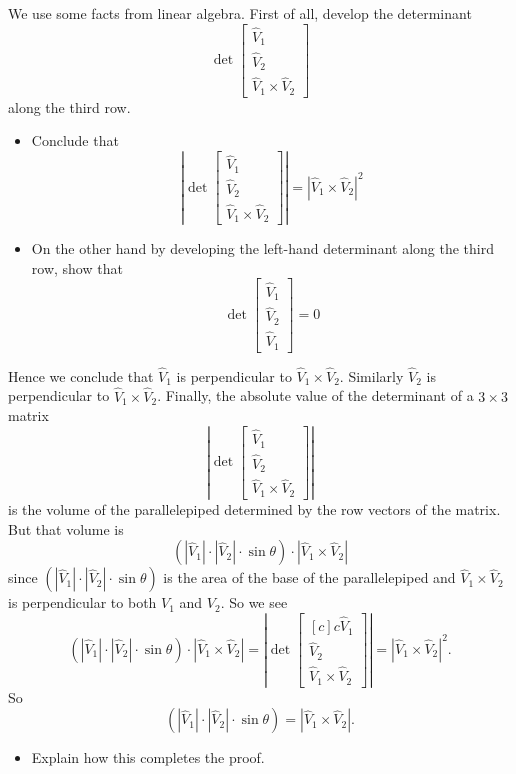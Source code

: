 \documentclass{ximera}
\begin{document}
\begin{problem}
We use some facts from linear algebra. First of all, develop the determinant%
\[
\det
\begin{bmatrix}
\hat{V}_{1} \\
\hat{V}_{2} \\
\hat{V}_{1}\times\hat{V}_{2}
\end{bmatrix}
\]
along the third row.
\begin{itemize}
\item Conclude that 
\[
\left\vert
\det
\begin{bmatrix}
\hat{V}_{1} \\
\hat{V}_{2} \\
\hat{V}_{1}\times\hat{V}_{2}
\end{bmatrix}\right\vert
=\left\vert \hat{V}_{1}\times\hat{V}_{2}\right\vert ^{2}
\]
\item On the other hand by developing the left-hand determinant along
  the third row, show that
\[
\det
\begin{bmatrix}
\hat{V}_{1} \\
\hat{V}_{2} \\
\hat{V}_{1}
\end{bmatrix}
=0
\]
\end{itemize}
Hence we conclude that $\hat{V}_{1}$ is perpendicular to
$\hat{V}_{1}\times\hat{V}_{2}$. Similarly $\hat{V}_{2}$ is
perpendicular to $\hat{V}_{1}\times\hat{V}_{2}$. Finally, the absolute
value of the determinant of a $3\times3$ matrix%
\[
\left\vert
\det
\begin{bmatrix}
\hat{V}_{1} \\
\hat{V}_{2} \\
\hat{V}_{1}\times\hat{V}_{2}
\end{bmatrix}
\right\vert
\]
is the volume of the parallelepiped determined by the row vectors of the
matrix. But that volume is%
\[
\left( \left\vert \hat{V}_{1}\right\vert \cdot\left\vert \hat{V}%
_{2}\right\vert \cdot\sin\theta\right)  \cdot\left\vert \hat{V}%
_{1}\times\hat{V}_{2}\right\vert
\]
since $\left(  \left\vert \hat{V}_{1}\right\vert \cdot\left\vert \hat{V}%
_{2}\right\vert \cdot\sin\theta\right)  $ is the area of the base
of the parallelepiped and $\hat{V}_{1}\times\hat{V}_{2}$ is perpendicular to
both $V_{1}$ and $V_{2}$. So we see
\[
\left(  \left\vert \hat{V}_{1}\right\vert \cdot\left\vert \hat{V}%
_{2}\right\vert \cdot\sin\theta\right)  \cdot\left\vert \hat{V}%
_{1}\times\hat{V}_{2}\right\vert =\left\vert
\det\begin{bmatrix}
[c]{c}%
\hat{V}_{1} \\
\hat{V}_{2} \\
\hat{V}_{1}\times\hat{V}_{2}
\end{bmatrix}
\right\vert =\left\vert \hat{V}_{1}\times\hat{V}_{2}\right\vert ^{2}.
\]
So%
\[
\left(  \left\vert \hat{V}_{1}\right\vert \cdot\left\vert \hat{V}%
_{2}\right\vert \cdot\sin\theta\right)  =\left\vert \hat{V}%
_{1}\times\hat{V}_{2}\right\vert .
\]
\begin{itemize}
\item Explain how this completes the proof. 
\end{itemize}
\end{problem}
\end{document}
